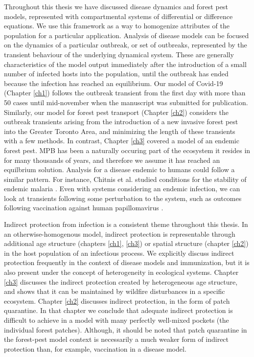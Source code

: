 Throughout this thesis we have discussed disease dynamics and forest pest models, represented with compartmental systems of differential or difference equations. We use this framework as a way to homogenize attributes of the population for a particular application. Analysis of disease models can be focused on the dynamics of a particular outbreak, or set of outbreaks, represented by the transient behaviour of the underlying dynamical system. These are generally characteristics of the model output immediately after the introduction of a small number of infected hosts into the population, until the outbreak has ended because the infection has reached an equilibrium. Our model of Covid-19 (Chapter \ref{ch1}) follows the outbreak transient from the first day with more than 50 cases until mid-november when the manuscript was submitted for publication. Similarly, our model for forest pest transport (Chapter \ref{ch2}) considers the outbreak transients arising from the introduction of a new invasive forest pest into the Greater Toronto Area, and minimizing the length of these transients with a few methods. In contrast, Chapter \ref{ch3} covered a model of an endemic forest pest. MPB has been a naturally occuring part of the ecosystem it resides in for many thousands of years, and therefore we assume it has reached an equilbrium solution. Analysis for a disease endemic to humans could follow a similar pattern. For instance, Chitnis et al. studied conditions for the stability of endemic malaria \cite{chitnis2006bifurcation}. Even with systems considering an endemic infection, we can look at transients following some perturbation to the system, such as outcomes following vaccination against human papillomavirus \cite{lee2012mathematical}. 

Indirect protection from infection is a consistent theme throughout this thesis. In an otherwise-homogenous model, indirect protection is representable through additional age structure (chapters \ref{ch1}, \ref{ch3}) or spatial structure (chapter \ref{ch2}) in the host population of an infectious process. We explicitly discuss indirect protection frequently in the context of disease models and immunization, but it is also present under the concept of heterogeneity in ecological systems. Chapter \ref{ch3} discusses the indirect protection created by heterogeneous age structure, and shows that it can be maintained by  wildfire disturbances in a specific ecosystem. Chapter \ref{ch2} discusses indirect protection, in the form of patch quarantine. In that chapter we conclude that adequate indirect protection is difficult to achieve in a model with many perfectly well-mixed pockets (the individual forest patches). Although, it should be noted that patch quarantine in the forest-pest model context is necessarily a much weaker form of indirect protection than, for example, vaccination in a disease model.


